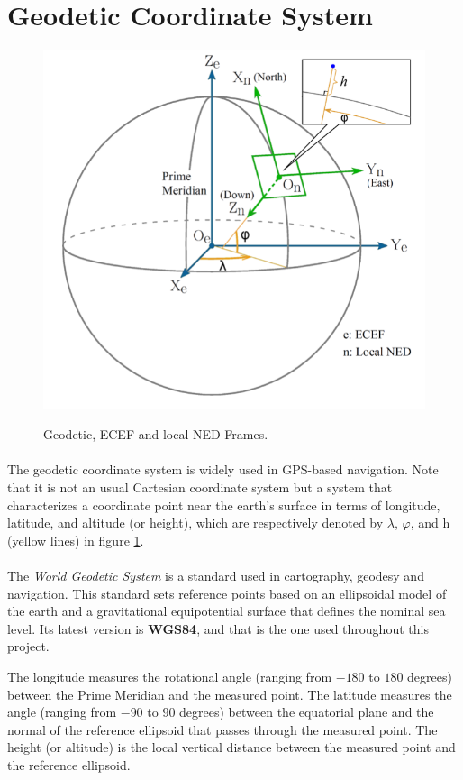 \section{Geodetic Coordinate System}\label{sec:coord}

\begin{figure}[H]
   \centering
    \includegraphics[width=.70\textwidth]{figures/GeoTemp1.png} 
    \label{fig:Geodetic}
    \caption{Geodetic, ECEF and local NED Frames.}  
\end{figure}

\paragraph{}The geodetic coordinate system is widely used in GPS-based navigation. Note that it is not an usual Cartesian coordinate system but a system that
characterizes a coordinate point near the earth’s surface in terms of longitude, latitude, and altitude (or height), which are respectively denoted by $\lambda$, $\varphi$, and h (yellow lines) in figure \ref{fig:Geodetic}.

\paragraph{}The \textit{World Geodetic System} is a standard used in cartography, geodesy and navigation. This standard sets reference points based on an ellipsoidal model of the earth and a gravitational equipotential surface that defines the nominal sea level. Its latest version is \textbf{WGS84}, and that is the one used throughout this project. 

The longitude measures the rotational angle (ranging from $-180$ to $180$ degrees) between the Prime Meridian and the measured point. The latitude measures the angle (ranging from $-90$ to $90$ degrees) between the equatorial plane and the normal of the reference ellipsoid that passes through the measured point. The height (or altitude) is the local vertical distance between the measured point and the reference ellipsoid.

